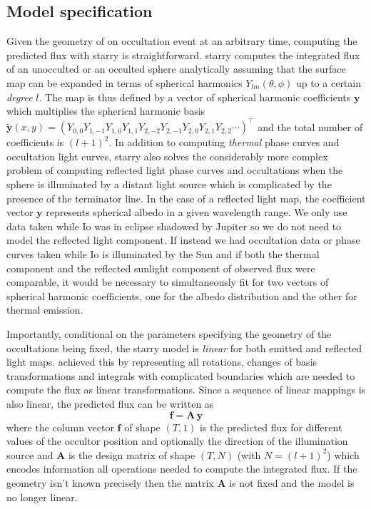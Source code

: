 \documentclass[modern]{aastex62}
\begin{document}
\subsection{Model specification}
\label{ssec:model_spec}
Given the geometry of on occultation event at an arbitrary time, computing the predicted flux with \textsf{starry} is straightforward.
\textsf{starry} computes the integrated flux of an unocculted or an occulted sphere analytically assuming that the surface map can be expanded in terms of spherical harmonics $Y_{lm}(\theta,\phi)$ up to a certain \emph{degree} $l$.
The map is thus defined by a vector of spherical harmonic coefficients $\mathbf{y}$ which multiplies the spherical harmonic basis $\tilde{\mathbf{y}}(x, y)=\left(Y_{0,0} Y_{1,-1} Y_{1,0} Y_{1,1} Y_{2,-2} Y_{2,-1} Y_{2,0} Y_{2,1} Y_{2,2} \cdots\right)^{\top}$ and the total number of coefficients is $(l+1)^2$.
In addition to computing \emph{thermal} phase curves and occultation light curves, \textsf{starry} also solves the considerably more complex problem of computing reflected light phase curves and occultations when the sphere is illuminated by a distant light source \citep[Luger et al. 2020 in prep][]{} which is complicated by the presence of the terminator line.
In the case of a reflected light map, the coefficient vector $\mathbf{y}$ represents spherical albedo in a given wavelength range.
We only use data taken while Io was in eclipse shadowed by Jupiter so we do not need to model the reflected light component. 
If instead we had occultation data or phase curves taken while Io is illuminated by the Sun and if both the thermal component and the reflected sunlight component of observed flux were comparable, it would be necessary to simultaneously fit for two vectors of spherical harmonic coefficients, 
one for the albedo distribution and the other for thermal emission.

Importantly, conditional on the parameters specifying the geometry of the occultations being fixed, the \textsf{starry} model is \emph{linear} for both emitted and reflected light maps.
\cite{luger2019} achieved this by representing all rotations, changes of basis transformations and integrals with complicated boundaries which are needed to compute the flux as linear transformations.
Since a sequence of linear mappings is also linear, the predicted flux can be written as
\begin{equation}
    \mathbf{f}=\mathbf{A}\,\mathbf{y}
    \label{eq:linear_model}
\end{equation}
where the column vector $\mathbf{f}$ of shape $(T, 1)$ is the predicted flux for different values of the occultor position and optionally the direction of the illumination source and $\mathbf{A}$ is the design
matrix of shape $(T, N)$ (with $N=(l+1)^2$) which encodes information all operations needed to compute the integrated flux.
If the geometry isn't known precisely then the matrix $\mathbf{A}$ is not fixed and the model is no longer linear.
\end{document}

